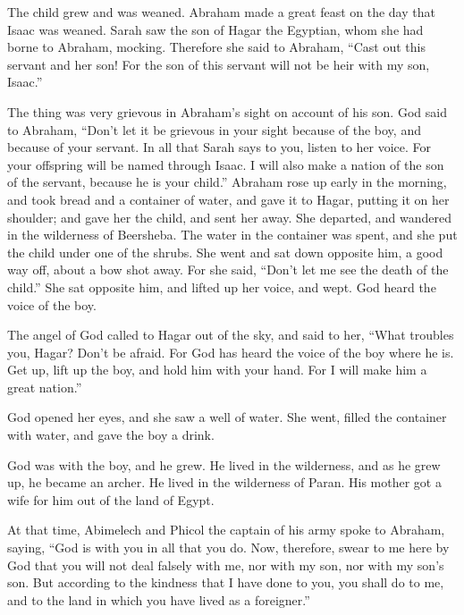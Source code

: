  The child grew and was weaned. Abraham made a great feast
on the day that Isaac was weaned.  Sarah saw the son of
Hagar the Egyptian, whom she had borne to Abraham, mocking.
 Therefore she said to Abraham, ``Cast out this servant
and her son! For the son of this servant will not be heir with my son,
Isaac.''

 The thing was very grievous in Abraham's sight on
account of his son.  God said to Abraham, ``Don't let it
be grievous in your sight because of the boy, and because of your
servant. In all that Sarah says to you, listen to her voice. For your
offspring will be named through Isaac.  I will also make
a nation of the son of the servant, because he is your child.''
 Abraham rose up early in the morning, and took bread and
a container of water, and gave it to Hagar, putting it on her shoulder;
and gave her the child, and sent her away. She departed, and wandered in
the wilderness of Beersheba.  The water in the container
was spent, and she put the child under one of the shrubs.
 She went and sat down opposite him, a good way off,
about a bow shot away. For she said, ``Don't let me see the death of the
child.'' She sat opposite him, and lifted up her voice, and wept.
 God heard the voice of the boy.

The angel of God called to Hagar out of the sky, and said to her, ``What
troubles you, Hagar? Don't be afraid. For God has heard the voice of the
boy where he is.  Get up, lift up the boy, and hold him
with your hand. For I will make him a great nation.''

 God opened her eyes, and she saw a well of water. She
went, filled the container with water, and gave the boy a drink.

 God was with the boy, and he grew. He lived in the
wilderness, and as he grew up, he became an archer.  He
lived in the wilderness of Paran. His mother got a wife for him out of
the land of Egypt.

 At that time, Abimelech and Phicol the captain of his
army spoke to Abraham, saying, ``God is with you in all that you do.
 Now, therefore, swear to me here by God that you will
not deal falsely with me, nor with my son, nor with my son's son. But
according to the kindness that I have done to you, you shall do to me,
and to the land in which you have lived as a foreigner.''

